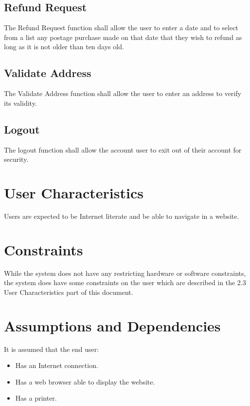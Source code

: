 \documentclass{scrreprt}
\begin{document}
\subsection{Refund Request}

The Refund Request function shall allow the user to enter a date and to select
from a list any postage purchase made on that date that they wish to refund as
long as it is not older than ten days old.

\subsection{Validate Address}

The Validate Address function shall allow the user to enter an address to
verify its validity.

\subsection{Logout}

The logout function shall allow the account user to exit out of their account
for security.

\section{User Characteristics}

Users are expected to be Internet literate and be able to navigate in a
website.

\section{Constraints}

While the system does not have any restricting hardware or software
constraints, the system does have some constraints on the user which are
described in the 2.3 User Characteristics part of this document.

\section{Assumptions and Dependencies}

It is assumed that the end user: 

\begin{itemize}
\item Has an Internet connection. 
\item Has a web browser able to display the website.
\item Has a printer.
\end{itemize}
\end{document}
